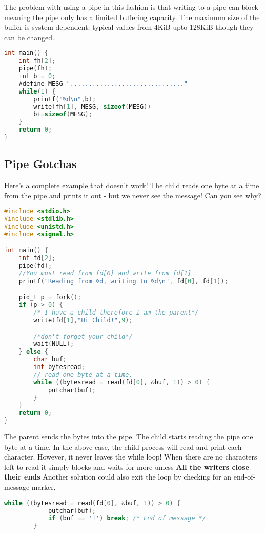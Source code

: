 The problem with using a pipe in this fashion is that writing to a pipe can block meaning the pipe only has a limited buffering capacity.
The maximum size of the buffer is system dependent; typical values from 4KiB upto 128KiB though they can be changed.

\begin{lstlisting}[language=C]
int main() {
    int fh[2];
    pipe(fh);
    int b = 0;
    #define MESG "..............................."
    while(1) {
        printf("%d\n",b);
        write(fh[1], MESG, sizeof(MESG))
        b+=sizeof(MESG);
    }
    return 0;
}
\end{lstlisting}

\subsection{Pipe Gotchas}

Here's a complete example that doesn't work! The child reads one byte at a time from the pipe and prints it out - but we never see the message! Can you see why?

\begin{lstlisting}[language=C]
#include <stdio.h>
#include <stdlib.h>
#include <unistd.h>
#include <signal.h>

int main() {
    int fd[2];
    pipe(fd);
    //You must read from fd[0] and write from fd[1]
    printf("Reading from %d, writing to %d\n", fd[0], fd[1]);

    pid_t p = fork();
    if (p > 0) {
        /* I have a child therefore I am the parent*/
        write(fd[1],"Hi Child!",9);

        /*don't forget your child*/
        wait(NULL);
    } else {
        char buf;
        int bytesread;
        // read one byte at a time.
        while ((bytesread = read(fd[0], &buf, 1)) > 0) {
            putchar(buf);
        }
    }
    return 0;
}
\end{lstlisting}

The parent sends the bytes  into the pipe.
The child starts reading the pipe one byte at a time.
In the above case, the child process will read and print each character.
However, it never leaves the while loop!
When there are no characters left to read it simply blocks and waits for more unless \textbf{All the writers close their ends}
Another solution could also exit the loop by checking for an end-of-message marker,

\begin{lstlisting}[language=C]
        while ((bytesread = read(fd[0], &buf, 1)) > 0) {
            putchar(buf);
            if (buf == '!') break; /* End of message */
        }
\end{lstlisting}


